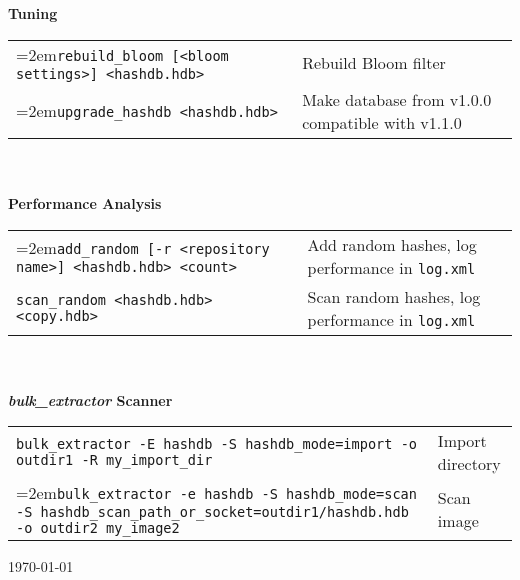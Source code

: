 \documentclass[12pt]{article}
\newcommand{\bulk}{\emph{bulk\_extractor}\xspace}
\begin{document}
\\
\\
\textbf{Tuning}\\
\begin{tabular}{p{3.6 in} p{4 in}}
\hangindent=2em\small\texttt{rebuild\_bloom [<bloom settings>] <hashdb.hdb>} & Rebuild Bloom filter \\
\hangindent=2em\small\texttt{upgrade\_hashdb <hashdb.hdb>} & Make database from v1.0.0 compatible with v1.1.0\\
\end{tabular}
\\
\\
\textbf{Performance Analysis}\\
\begin{tabular}{p{3.6 in} p{4 in}}
\hangindent=2em\small\texttt{add\_random [-r <repository name>] <hashdb.hdb> <count>} & Add random hashes, log performance in \texttt{log.xml}\\
\small\texttt{scan\_random <hashdb.hdb> <copy.hdb>} & Scan random hashes, log performance in \texttt{log.xml}\\
\end{tabular}
\\
\\
\textbf{\bulk Scanner}\\
\begin{tabular}{p{5.8 in} l}
\small\texttt{bulk\_extractor -E hashdb -S hashdb\_mode=import -o outdir1 -R my\_import\_dir} & Import directory\\
\hangindent=2em\small\texttt{bulk\_extractor -e hashdb -S hashdb\_mode=scan -S hashdb\_scan\_path\_or\_socket=outdir1/hashdb.hdb -o outdir2 my\_image2} & Scan image\\
\end{tabular}

\vspace{2mm}
\begin{center}
\begin{footnotesize}
\today
\end{footnotesize}
\end{center}
\end{document}
